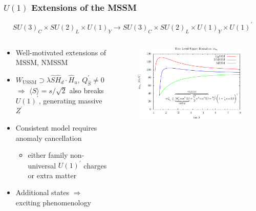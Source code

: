 \documentclass[10pt,aspectratio=169]{beamer}
\begin{document}
\begin{frame}
  \frametitle{$U(1)$ Extensions of the MSSM}
    \begin{equation*}
      SU(3)_C \times SU(2)_L \times U(1)_Y \to
      SU(3)_C \times SU(2)_L \times U(1)_Y \times U(1)^\prime
    \end{equation*}
    \vspace{-15pt}
  \begin{columns}[t]
    \begin{column}{0.45\textwidth}
      \begin{itemize} \itemsep1em
        \item Well-motivated extensions of MSSM, NMSSM
        \item $W_{\text{USSM}} \supset \lambda \hat{S} \hat{H}_d
          \cdot \hat{H}_u$, $Q^\prime_{\hat{S}} \neq 0$ $\Rightarrow$
          $\langle S \rangle = s / \sqrt{2}$ also breaks $U(1)^\prime$,
          generating {\color{blue} massive $Z^\prime$}
        \item Consistent model requires anomaly cancellation
          \begin{itemize}
            \item either family non-universal $U(1)^\prime$ charges
              or {\color{blue} extra matter}
          \end{itemize}
        \item Additional states $\Rightarrow$ exciting phenomenology
      \end{itemize}
    \end{column}
    \begin{column}{0.6\textwidth}
      \vspace{-10pt}
      \begin{figure}
        \centering
        \includegraphics[width=\textwidth]{treelevel_higgs_upperbound_plot}

\end{figure}
\end{column}
\end{columns}
\end{frame}
\end{document}
